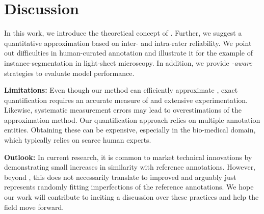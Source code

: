 \section{Discussion}
In this work, we introduce the theoretical concept of .
Further, we suggest a quantitative approximation based on inter- and intra-rater reliability.
We point out difficulties in human-curated annotation and illustrate it for the example of instance-segmentation in light-sheet microscopy.
In addition, we provide \emph{-aware} strategies to evaluate model performance.

\noindent\textbf{Limitations:}
Even though our method can efficiently approximate , exact quantification requires an accurate measure of  and extensive experimentation.
Likewise, systematic measurement errors may lead to overestimations of the  approximation method.
Our quantification approach relies on multiple annotation entities.
Obtaining these can be expensive, especially in the bio-medical domain, which typically relies on scarce human experts.

\noindent\textbf{Outlook:}
In current  research, it is common to market technical innovations by demonstrating small increases in similarity with reference annotations.
However, beyond , this does not necessarily translate to improved  and arguably just represents randomly fitting imperfections of the reference annotations.
We hope our work will contribute to inciting a discussion over these practices and help the field move forward.

\vspace{\baselineskip}

